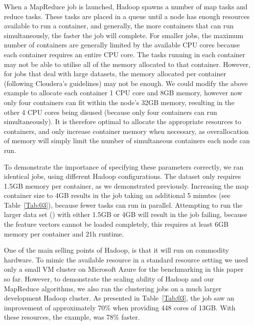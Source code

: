 \documentclass{bioinfo}
\begin{document}
When a MapReduce job is launched, Hadoop spawns a number of map tasks and reduce tasks. 
These tasks are placed in a queue until a node has enough resources available to run a container, and generally, the more containers that can run simultaneously, the faster the job will complete.
For smaller jobs, the maximum number of containers are generally limited by the available CPU cores because each container requires an entire CPU core. The tasks running in each container may not be able to utilise all of the memory allocated to that container.
However, for jobs that deal with large datasets, the memory allocated per container (following Cloudera's guidelines) may not be enough.
We could modify the above example to allocate each container 1 CPU core and 8GB memory, however now only four containers can fit within the node's 32GB memory, resulting in the other 4 CPU cores being disused (because only four containers can run simultaneously). It is therefore optimal to
allocate the appropriate resources to containers, and only increase container memory when necessary, as overallocation of memory will simply limit the number of simultaneous containers each node can run.

To demonstrate the importance of specifying these parameters correctly, we ran identical jobs, using different Hadoop configurations. 
The \OnePhaseone{} dataset only requires 1.5GB memory per container, as we demonstrated previously.
Increasing the map container size to 4GB results in the job taking an additional 5 minutes (see Table~\ref{Tab:03}), because fewer tasks can run in parallel. 
Attempting to run the larger data set (\FullPhasethree{}) with either 1.5GB or 4GB will result in the job failing, because the feature vectors cannot be loaded completely, this requires at least 6GB memory per container and 21h runtime. 

One of the main selling points of Hadoop, is that it will run on commodity hardware. 
To mimic the available resource in a standard resource setting we used only a small VM cluster on Microsoft Azure for the benchmarking in this paper so far.
However, to demonstrate the scaling ability of Hadoop and our MapReduce algorithms, we also ran the clustering jobs on a much larger development Hadoop cluster. 
As presented in Table~\ref{Tab:03}, the \OnePhaseone{} job saw an improvement of approximately 70\% when providing 448 cores of 13GB. 
With these resources, the \FullPhasethree{} example, was 78\% faster.
\end{document}
